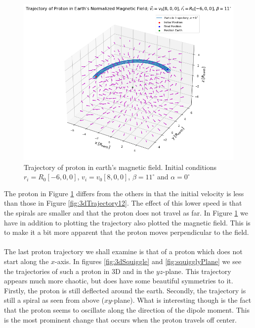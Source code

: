 \begin{figure}[H]
    \centering
    \includegraphics[scale=.4]{Images/protonTrajectory3.png}
    \caption{Trajectory of proton in earth's magnetic field. Initial conditions $r_i=R_0[-6,0,0]$, $v_i=v_0[8,0,0]$, $\beta=11^{\circ}$ and $\alpha=0^{\circ}$}
    \label{fig:3dTrajectory3}
\end{figure}

\noindent The proton in Figure \ref{fig:3dTrajectory3} differs from the others in that the initial velocity is less than those in Figure \ref{fig:3dTrajectory12}. The effect of this lower speed is that the spirals are smaller and that the proton does not travel as far. In Figure \ref{fig:3dTrajectory3} we have in addition to plotting the trajectory also plotted the magnetic field. This is to make it a bit more apparent that the proton moves perpendicular to the field.\\
\\
The last proton trajectory we shall examine is that of a proton which does not start along the $x$-axis. In figures \ref{fig:3dSquiggle} and \ref{fig:squigglyPlane} we see the trajectories of such a proton in 3D and in the $yz$-plane. This trajectory appears much more chaotic, but does have some beautiful symmetries to it. Firstly, the proton is still deflected around the earth. Secondly, the trajectory is still a spiral as seen from above ($xy$-plane). What is interesting though is the fact that the proton seems to oscillate along the direction of the dipole moment. This is the most prominent change that occurs when the proton travels off center.

